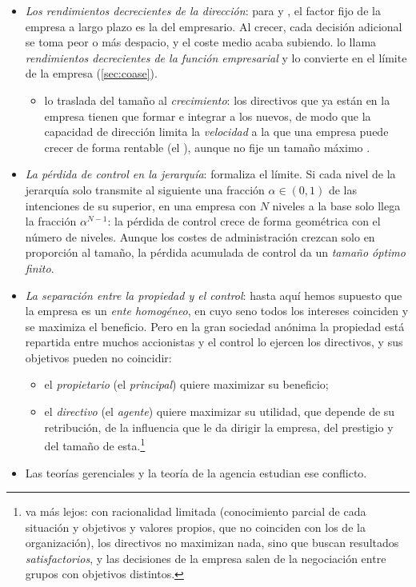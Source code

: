 \documentclass[11pt]{article}
\begin{document}
\begin{itemize}
\item \emph{Los rendimientos decrecientes de la dirección}: para \textcite{Kaldor1934Equilibrium} y \textcite{Robinson1934Problem}, el factor fijo de la empresa a largo plazo es la  del empresario. Al crecer, cada decisión adicional se toma peor o más despacio, y el coste medio acaba subiendo. \textcite{Coase1937Nature} lo llama \emph{rendimientos decrecientes de la función empresarial} y lo convierte en el límite de la empresa (\ref{sec:coase}).
  \begin{itemize}
  \item \textcite{Penrose1959Theory} lo traslada del tamaño al \emph{crecimiento}: los directivos que ya están en la empresa tienen que formar e integrar a los nuevos, de modo que la capacidad de dirección limita la \emph{velocidad} a la que una empresa puede crecer de forma rentable (el ), aunque no fije un tamaño máximo .
  \end{itemize}
\item \emph{La pérdida de control en la jerarquía}: \textcite{Williamson1967Hierarchical} formaliza el límite. Si cada nivel de la jerarquía solo transmite al siguiente una fracción $\alpha\in(0,1)$ de las intenciones de su superior, en una empresa con $N$ niveles a la base solo llega la fracción $\alpha^{N-1}$: la pérdida de control crece de forma geométrica con el número de niveles. Aunque los costes de administración crezcan solo en proporción al tamaño, la pérdida acumulada de control da un \emph{tamaño óptimo finito}.
\item \emph{La separación entre la propiedad y el control}: hasta aquí hemos supuesto que la empresa es un \emph{ente homogéneo}, en cuyo seno todos los intereses coinciden y se maximiza el beneficio. Pero en la gran sociedad anónima la propiedad está repartida entre muchos accionistas y el control lo ejercen los directivos\nocite{BerleMeans1932Modern}, y sus objetivos pueden no coincidir:
  \begin{itemize}
  \item el \emph{propietario} (el \emph{principal}) quiere maximizar su beneficio;
  \item el \emph{directivo} (el \emph{agente}) quiere maximizar su utilidad, que depende de su retribución, de la influencia que le da dirigir la empresa, del prestigio y del tamaño de esta.\footnote{\textcite{Simon1955Behavioral} va más lejos: con racionalidad limitada (conocimiento parcial de cada situación y objetivos y valores propios, que no coinciden con los de la organización), los directivos no maximizan nada, sino que buscan resultados \emph{satisfactorios}, y las decisiones de la empresa salen de la negociación entre grupos con objetivos distintos\nocite{CyertMarch1963Behavioral}.}
  \end{itemize}
\item Las teorías gerenciales y la teoría de la agencia estudian ese conflicto.
\end{itemize}
\end{document}
